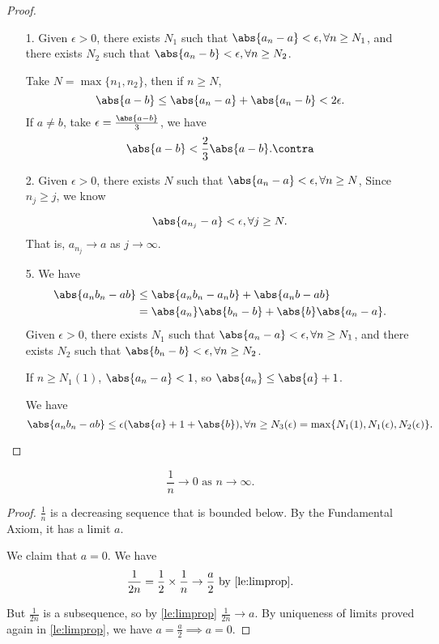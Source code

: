 \begin{proof}
    \leavevmode
    \begin{enumerate}
        \item[1.] Given \(\epsilon > 0\), there exists \(N_1\) such that \(\abs{a_n - a} < \epsilon, \forall n \geq N_1\), and there exists \(N_2\) such that \(\abs{a_n - b} < \epsilon, \forall n \geq N_2\).

        Take \(N = \max\{n_1, n_2\}\), then if \(n \geq N\),
        \[
            \abs{a - b} \leq \abs{a_n - a} +\abs{a_n -b} < 2\epsilon.
        \]
        If \(a \neq b\), take \(\epsilon = \frac{\abs{a - b}}{3}\), we have
        \[
            \abs{a - b} < \frac{2}{3}\abs{a - b}. \contra
        \]
        \item[2.] Given \(\epsilon > 0\), there exists \(N\) such that \(\abs{a_n - a} < \epsilon, \forall n \geq N\), Since \(n_j \geq j\), we know

        \[
            \abs{a_{n_j} - a} < \epsilon, \forall j \geq  N.
        \]
        That is, \(a_{n_j} \to a\) as \(j \to \infty\).
        \item[5.] We have
        \begin{align*}
            \abs{a_n b_n - ab} &\leq \abs{a_n b_n - a_n b} + \abs{a_n b - ab}\\
            &= \abs{a_n} \abs{b_n - b} + \abs{b} \abs{a_n - a}.
        \end{align*}
        Given \(\epsilon > 0\), there exists \(N_1\) such that \(\abs{a_n - a} < \epsilon, \forall n \geq N_1\), and there exists \(N_2\) such that \(\abs{b_n - b} < \epsilon, \forall n \geq N_2\).

        If \(n \geq N_1(1)\), \(\abs{a_n - a} < 1 \), so \(\abs{a_n} \leq \abs{a} + 1\).

        We have
        \[
            \abs{a_n b_n - ab} \leq \epsilon(\abs{a} +1+\abs{b}), \forall n \geq N_3(\epsilon) = \max\{N_1(1),N_1(\epsilon),N_2(\epsilon)\}.
        \]
    \end{enumerate}
\end{proof}
\begin{lemma}{}{}
    \[
        \frac{1}{n} \to 0 \text{ as } n\to \infty.
    \]
\end{lemma}
\begin{proof}
    \(\frac{1}{n}\) is a decreasing sequence that is bounded below. By the Fundamental Axiom, it has a limit \(a\).
    
    We claim that \(a = 0\). We have
    \[
        \frac{1}{2n}=\frac{1}{2}\times \frac{1}{n}\to \frac{a}{2} \text{ by \cref{le:limprop}}.
    \]

    But \(\frac{1}{2n}\) is a subsequence, so by \cref{le:limprop} \(\frac{1}{2n}\to a\). By uniqueness of limits proved again in \cref{le:limprop}, we have \(a = \frac{a}{2} \implies a = 0\).
\end{proof}
